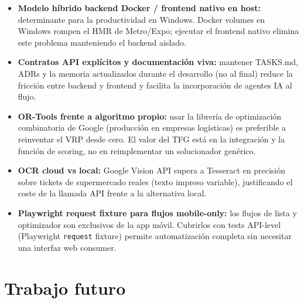 \begin{itemize}
  \item \textbf{Modelo h\'ibrido backend Docker / frontend nativo en host:} determinante para la
    productividad en Windows. Docker volumes en Windows rompen el HMR de Metro/Expo; ejecutar el
    frontend nativo elimina este problema manteniendo el backend aislado.

  \item \textbf{Contratos API expl\'icitos y documentaci\'on viva:} mantener TASKS.md, ADRs y la
    memoria actualizados durante el desarrollo (no al final) reduce la fricci\'on entre backend y
    frontend y facilita la incorporaci\'on de agentes IA al flujo.

  \item \textbf{OR-Tools frente a algoritmo propio:} usar la librer\'ia de optimizaci\'on
    combinatoria de Google (producci\'on en empresas log\'isticas) es preferible a reinventar el
    VRP desde cero. El valor del TFG est\'a en la integraci\'on y la funci\'on de scoring, no en
    reimplementar un solucionador gen\'erico.

  \item \textbf{OCR cloud vs local:} Google Vision API supera a Tesseract en precisi\'on sobre
    tickets de supermercado reales (texto impreso variable), justificando el coste de la llamada
    API frente a la alternativa local.

  \item \textbf{Playwright request fixture para flujos mobile-only:} los flujos de lista y
    optimizador son exclusivos de la app m\'ovil. Cubrirlos con tests API-level (Playwright
    \texttt{request} fixture) permite automatizaci\'on completa sin necesitar una interfaz web
    consumer.
\end{itemize}

\section{Trabajo futuro}\label{sec:trabajofuturo}

